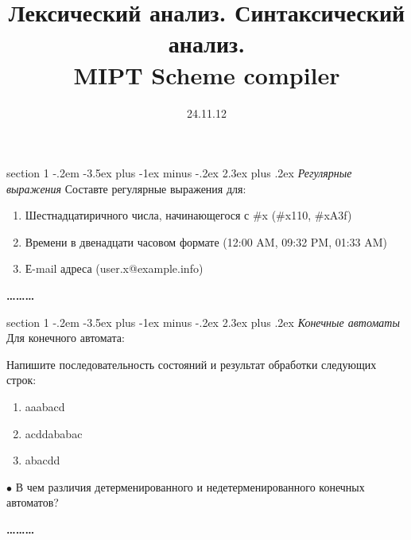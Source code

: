 \documentclass[twocolumn,a4,10pt]{article}
\makeatletter
\newenvironment{problem}{\@startsection
       {section}
       {1}
       {-.2em}
       {-3.5ex plus -1ex minus -.2ex}
       {2.3ex plus .2ex}
       {\pagebreak[3]%
       \large\bf\noindent{Задача }
       }
       }
       {%
       \begin{center}\large\bf \ldots\ldots\ldots\end{center}}
\makeatother
\begin{document}
\title{Лексический анализ. Синтаксический анализ. \\
      {\small  MIPT Scheme compiler }}
\date{24.11.12}

\maketitle

\thispagestyle{empty}

\begin{problem}{\it Регулярные выражения}
Составте регулярные выражения для:
\begin{enumerate}
\item Шестнадцатиричного числа, начинающегося с \#x (\#x110, \#xA3f)
\item Времени в двенадцати часовом формате (12:00 AM, 09:32 PM, 01:33 AM)
\item Е-mail адреса (user.x@example.info)
\end{enumerate}
\end{problem}

\begin{problem}{\it Конечные автоматы}
Для конечного автомата:
  

Напишите последовательность состояний и результат обработки следующих строк:
\begin{enumerate}
\item aaabacd
\item acddababac
\item abacdd
\end{enumerate}
$\bullet$ В чем различия детерменированного и недетерменированного конечных автоматов?
\end{problem}
\end{document}
